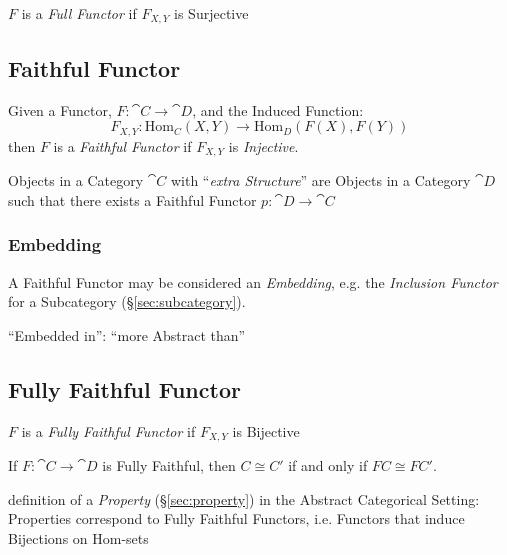 $F$ is a \emph{Full Functor} if $F_{X,Y}$ is Surjective



\subsection{Faithful Functor}\label{sec:faithful_functor}

Given a Functor, $F : \cat{C} \rightarrow \cat{D}$, and the Induced Function:
\[
  F_{X,Y} : \mathrm{Hom}_C(X,Y) \rightarrow \mathrm{Hom}_D(F(X),F(Y))
\]
then $F$ is a \emph{Faithful Functor} if $F_{X,Y}$ is \emph{Injective}.

Objects in a Category $\cat{C}$ with ``\emph{extra Structure}'' are Objects in a
Category $\cat{D}$ such that there exists a Faithful Functor
$p : \cat{D} \rightarrow \cat{C}$



\subsubsection{Embedding}\label{sec:category_embedding}

A Faithful Functor may be considered an \emph{Embedding}, e.g. the
\emph{Inclusion Functor} for a Subcategory (\S\ref{sec:subcategory}).

``Embedded in'': ``more Abstract than''



\subsection{Fully Faithful Functor}\label{sec:fully_faithful}

$F$ is a \emph{Fully Faithful Functor} if $F_{X,Y}$ is Bijective

If $F : \cat{C} \rightarrow \cat{D}$ is Fully Faithful, then $C
\cong C'$ if and only if $FC \cong FC'$.

definition of a \emph{Property} (\S\ref{sec:property}) in the Abstract
Categorical Setting: Properties correspond to Fully Faithful Functors, i.e.
Functors that induce Bijections on Hom-sets



